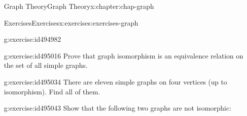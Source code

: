 \documentclass[oneside,10pt,]{book}
\numberwithin{equation}{section}
\begin{document}
\begin{chapterptx}{Graph Theory}{}{Graph Theory}{}{}{x:chapter:chap-graph}
\begin{exercises-section}{Exercises}{}{Exercises}{}{}{x:exercises:exercises-graph}
\begin{divisionexercise}{13}{}{}{g:exercise:id494982}
\begin{sidebyside}{3}{0.0366666666666667}{0.0366666666666667}{0.0733333333333333}
\begin{sbspanel}{0.25}
{
}%
\end{sbspanel}%
\end{sidebyside}%
\end{divisionexercise}%
\begin{divisionexercise}{14}{}{}{g:exercise:id495016}%
Prove that graph isomorphism is an equivalence relation on the set of all simple graphs.%
\end{divisionexercise}%
\begin{divisionexercise}{15}{}{}{g:exercise:id495034}%
There are eleven simple graphs on four vertices (up to isomorphism). Find all of them.%
\end{divisionexercise}%
\begin{divisionexercise}{16}{}{}{g:exercise:id495043}%
Show that the following two graphs are not isomorphic:%
\begin{sidebyside}{2}{0.3}{0.3}{0.06}%
\begin{sbspanel}{0.17}%
\end{sbspanel}
\end{sidebyside}
\end{divisionexercise}
\end{exercises-section}
\end{chapterptx}
\end{document}

